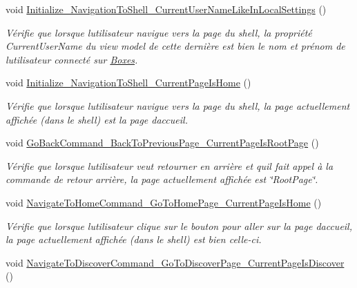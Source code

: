 \begin{DoxyCompactItemize}
void \hyperlink{class_boxes_1_1_tests_1_1_shell_view_model_tests_ad2366c7a2e965ce09e61029325572a25}{Initialize\+\_\+\+Navigation\+To\+Shell\+\_\+\+Current\+User\+Name\+Like\+In\+Local\+Settings} ()
\begin{DoxyCompactList}\small\item\em Vérifie que lorsque l\textquotesingle{}utilisateur navigue vers la page du shell, la propriété {\ttfamily Current\+User\+Name} du view model de cette dernière est bien le nom et prénom de l\textquotesingle{}utilisateur connecté sur \hyperlink{namespace_boxes}{Boxes}. \end{DoxyCompactList}\item 
void \hyperlink{class_boxes_1_1_tests_1_1_shell_view_model_tests_a855d6d814d441bb6f2ef80f1e76723e9}{Initialize\+\_\+\+Navigation\+To\+Shell\+\_\+\+Current\+Page\+Is\+Home} ()
\begin{DoxyCompactList}\small\item\em Vérifie que lorsque l\textquotesingle{}utilisateur navigue vers la page du shell, la page actuellement affichée (dans le shell) est la page d\textquotesingle{}accueil. \end{DoxyCompactList}\item 
void \hyperlink{class_boxes_1_1_tests_1_1_shell_view_model_tests_a0cb0374023b579915ff7b8dbaab50368}{Go\+Back\+Command\+\_\+\+Back\+To\+Previous\+Page\+\_\+\+Current\+Page\+Is\+Root\+Page} ()
\begin{DoxyCompactList}\small\item\em Vérifie que lorsque l\textquotesingle{}utilisateur veut retourner en arrière et qu\textquotesingle{}il fait appel à la commande de retour arrière, la page actuellement affichée est \char`\"{}\+Root\+Page\char`\"{}. \end{DoxyCompactList}\item 
void \hyperlink{class_boxes_1_1_tests_1_1_shell_view_model_tests_a63775bfa95676344108cf99d5ad0b7be}{Navigate\+To\+Home\+Command\+\_\+\+Go\+To\+Home\+Page\+\_\+\+Current\+Page\+Is\+Home} ()
\begin{DoxyCompactList}\small\item\em Vérifie que lorsque l\textquotesingle{}utilisateur clique sur le bouton pour aller sur la page d\textquotesingle{}accueil, la page actuellement affichée (dans le shell) est bien celle-\/ci. \end{DoxyCompactList}\item 
void \hyperlink{class_boxes_1_1_tests_1_1_shell_view_model_tests_a7e9fbccaebbd355c5b3a7c4980608f12}{Navigate\+To\+Discover\+Command\+\_\+\+Go\+To\+Discover\+Page\+\_\+\+Current\+Page\+Is\+Discover} ()

\end{DoxyCompactItemize}
